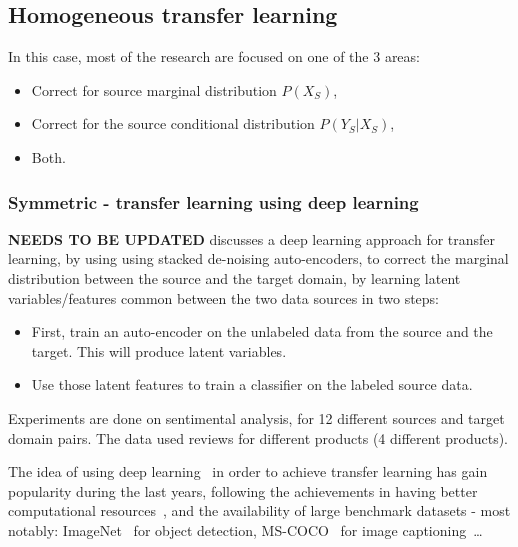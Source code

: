   \subsection{Homogeneous transfer learning}
  \par In this case, most of the research are focused on one of the 3 areas:
  \begin{itemize}
      \item Correct for source marginal distribution $P(X_S)$,
      \item Correct for the source conditional distribution $P(Y_S|X_S)$,
      \item Both.
  \end{itemize}

  \subsubsection{Symmetric - transfer learning using deep learning}
  \textbf{NEEDS TO BE UPDATED}\citep{glorot2011domain} discusses a deep learning approach for transfer learning, by using using stacked de-noising auto-encoders, to correct the marginal distribution between the source and the target domain, by learning latent variables/features common between the two data sources in two steps:
  \begin{itemize}
      \item First, train an auto-encoder on the unlabeled data from the source and the target. This will produce latent variables.
      \item Use those latent features to train a classifier on the labeled source data.
  \end{itemize}
  \par Experiments are done on sentimental analysis, for 12 different sources and target domain pairs. The data used reviews for different products (4 different products). 

  \par The idea of using deep learning~\citep{lecun2015deep} in order to achieve transfer learning has gain popularity during the last years, following the achievements in having better computational resources~\citep{raina2009large}, and the availability of large benchmark datasets - most notably: ImageNet~\citep{imagenet_cvpr09} for object detection, MS-COCO~\citep{2014arXiv1405.0312L} for image captioning~\ldots

